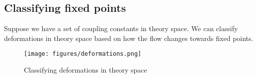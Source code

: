 \subsection{Classifying fixed points} 
Suppose we have a set of coupling constants in theory space. 
We can classify deformations in theory 
space based on how the flow changes towards fixed points. 

\begin{figure}[h]
	\centering
	\texttt{[image: figures/deformations.png]}
	\caption{Classifying deformations in theory space}%
	\label{fig:deformations}
\end{figure}


